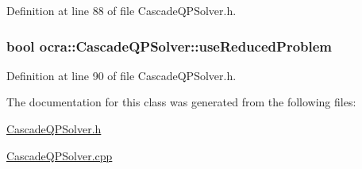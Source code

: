 Definition at line 88 of file Cascade\+Q\+P\+Solver.\+h.

\subsubsection[{\texorpdfstring{use\+Reduced\+Problem}{useReducedProblem}}]{\setlength{\rightskip}{0pt plus 5cm}bool ocra\+::\+Cascade\+Q\+P\+Solver\+::use\+Reduced\+Problem\hspace{0.3cm}{\ttfamily [protected]}}\hypertarget{classocra_1_1CascadeQPSolver_a8703a516e8ce6adb088867d8b39dfa4d}{}\label{classocra_1_1CascadeQPSolver_a8703a516e8ce6adb088867d8b39dfa4d}


Definition at line 90 of file Cascade\+Q\+P\+Solver.\+h.



The documentation for this class was generated from the following files\+:\begin{DoxyCompactItemize}
\item 
\hyperlink{CascadeQPSolver_8h}{Cascade\+Q\+P\+Solver.\+h}\item 
\hyperlink{CascadeQPSolver_8cpp}{Cascade\+Q\+P\+Solver.\+cpp}\end{DoxyCompactItemize}
